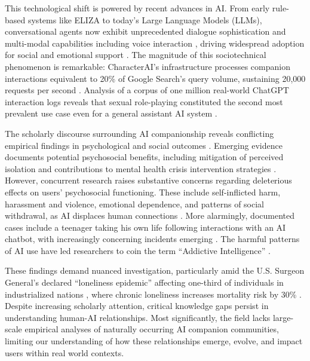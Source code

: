 \documentclass[sigconf, nonacm]{acmart}
\begin{document}
This technological shift is powered by recent advances in AI. From early rule-based systems like ELIZA \cite{weizenbaum1966eliza} to today's Large Language Models (LLMs), conversational agents now exhibit unprecedented dialogue sophistication \cite{park2023generative, park2024generative, pataranutaporn2021ai, pataranutaporn2024future} and multi-modal capabilities including voice interaction \cite{seaborn2021voice, reicherts2022s, fang2025ai, phang2025investigating}, driving widespread adoption for social and emotional support \cite{koulouri2022chatbots, xygkou2024mindtalker, xygkou2023conversation}. The magnitude of this sociotechnical phenomenon is remarkable: CharacterAI's infrastructure processes companion interactions equivalent to 20\% of Google Search's query volume, sustaining 20,000 requests per second \cite{kirk2025human}.  Analysis of a corpus of one million real-world ChatGPT interaction logs reveals that sexual role-playing constituted the second most prevalent use case even for a general assistant AI system \cite{mahari2025addictive, longpre2024consent}. 

The scholarly discourse surrounding AI companionship reveals conflicting empirical findings in psychological and social outcomes \cite{fang2025ai, phang2025investigating, liu2024chatbot, xia2024impact}. Emerging evidence documents potential psychosocial benefits, including mitigation of perceived isolation and contributions to mental health crisis intervention strategies 
\cite{loveys2019reducing, gasteiger2021friends, de2024ai, maples2024loneliness, heinz2025randomized, maples2024loneliness}. However, concurrent research raises substantive concerns regarding deleterious effects on users' psychosocial functioning. These include self-inflicted harm, harassment and violence, emotional dependence, and patterns of social withdrawal, as AI displaces human connections \cite{arnd2015sherry, zhang2025dark, fang2025ai, phang2025investigating, laestadius2024too}. More alarmingly, documented cases include a teenager taking his own life following interactions with an AI chatbot, with increasingly concerning incidents emerging \cite{mahari2025addictive}. The harmful patterns of AI use have led researchers to coin the term ``Addictive Intelligence'' \cite{mahari2025addictive, mahari2024we}.

These findings demand nuanced investigation, particularly amid the U.S. Surgeon General's declared ``loneliness epidemic'' \cite{us2023new} affecting one-third of individuals in industrialized nations \cite{loveys2019reducing}, where chronic loneliness increases mortality risk by 30\% \cite{chawla2021prevalence}. Despite increasing scholarly attention, critical knowledge gaps persist in understanding human-AI relationships. Most significantly, the field lacks large-scale empirical analyses of naturally occurring AI companion communities, limiting our understanding of how these relationships emerge, evolve, and impact users within real world contexts. 
\end{document}
